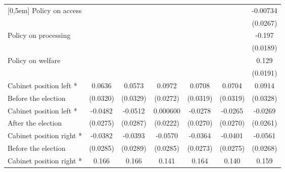 \begin{table}[!ht]
\begin{tabular}{l*{6}{c}}
[0,5em]
Policy on access    &                     &                     &                     &                     &                     &    -0.00734         \\
                    &                     &                     &                     &                     &                     &    (0.0267)         \\
[0,5em]
Policy on processing&                     &                     &                     &                     &                     &      -0.197\sym{***}\\
                    &                     &                     &                     &                     &                     &    (0.0189)         \\
[0,5em]
Policy on welfare   &                     &                     &                     &                     &                     &       0.129\sym{***}\\
                    &                     &                     &                     &                     &                     &    (0.0191)         \\
[0,5em]
Cabinet position left *&      0.0636         &      0.0573         &      0.0972\sym{***}&      0.0708\sym{*}  &      0.0704\sym{*}  &      0.0914\sym{**} \\
 Before the election           &    (0.0320)         &    (0.0329)         &    (0.0272)         &    (0.0319)         &    (0.0319)         &    (0.0328)         \\
[0,5em]
Cabinet position left *&     -0.0482         &     -0.0512         &    0.000600         &     -0.0278         &     -0.0265         &     -0.0269         \\
 After the election                    &    (0.0275)         &    (0.0287)         &    (0.0222)         &    (0.0270)         &    (0.0270)         &    (0.0261)         \\
[0,5em]
Cabinet position right *&     -0.0382         &     -0.0393         &     -0.0570         &     -0.0364         &     -0.0401         &     -0.0561\sym{*}  \\
 Before the election                    &    (0.0285)         &    (0.0289)         &    (0.0285)         &    (0.0273)         &    (0.0275)         &    (0.0268)         \\
[0,5em]
Cabinet position right *&       0.166\sym{***}&       0.166\sym{***}&       0.141\sym{***}&       0.164\sym{***}&       0.140\sym{***}&       0.159\sym{***}\\

\end{tabular}
\end{table}
